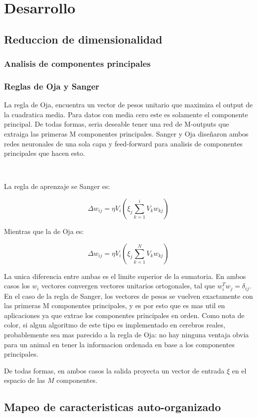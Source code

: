 \documentclass[informe.tex]{subfiles}
\begin{document}
  
  \section{Desarrollo}
    \subsection{Reduccion de dimensionalidad}
      \subsubsection{Analisis de componentes principales}
      \subsubsection{Reglas de Oja y Sanger}
	La regla de Oja, encuentra un vector de pesos unitario que maximiza el output de la cuadratica media. Para datos con media cero este es solamente el componente principal. De todas formas, seria deseable tener una red de M-outputs que extraiga las primeras M componentes principales. Sanger y Oja diseñaron ambos redes neuronales de una sola capa y feed-forward para analisis de componentes principales que hacen esto.
	
	~
	
	La regla de aprenzaje se Sanger es:

	$$\Delta w_{ij} = \eta V_i(\xi_j \sum_{k=1}^{i} V_k w_{kj} )$$

	Mientras que la de Oja es:

	$$\Delta w_{ij} = \eta V_i(\xi_j \sum_{k=1}^{N} V_k w_{kj} )$$

	La unica diferencia entre ambas es el limite superior de la sumatoria. En ambos casos los $w_i$ vectores convergen vectores unitarios ortogonales, tal que $w^{T}_i w_j = \delta_{ij}$. En el caso de la regla de Sanger, los vectores de pesos se vuelven exactamente con las primeras M componentes principales, y es por esto que es mas util en aplicaciones ya que extrae los componentes principales en orden. Como nota de color, si algun algoritmo de este tipo es implementado en cerebros reales, probablemente sea mas parecido a la regla de Oja: no hay ninguna ventaja obvia para un animal en tener la informacion ordenada en base a los componentes principales. 

	De todas formas, en ambos casos la salida proyecta un vector de entrada $\xi$ en el espacio de las $M$ componentes.
    \subsection{Mapeo de caracteristicas auto-organizado}
  
\end{document}
